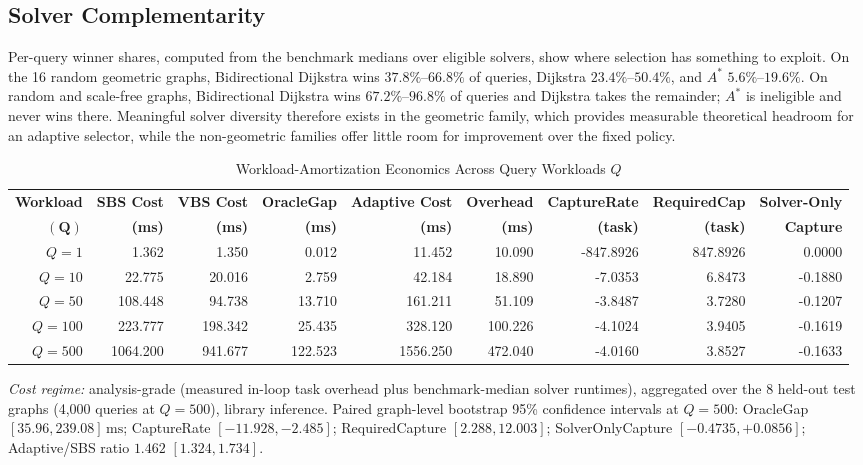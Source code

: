 \documentclass[conference]{IEEEtran}
\begin{document}
\subsection{Solver Complementarity}
\label{sec:complementarity}
Per-query winner shares, computed from the benchmark medians over eligible solvers, show where selection has something to exploit. On the 16 random geometric graphs, Bidirectional Dijkstra wins $37.8\%$--$66.8\%$ of queries, Dijkstra $23.4\%$--$50.4\%$, and $A^*$ $5.6\%$--$19.6\%$. On random and scale-free graphs, Bidirectional Dijkstra wins $67.2\%$--$96.8\%$ of queries and Dijkstra takes the remainder; $A^*$ is ineligible and never wins there. Meaningful solver diversity therefore exists in the geometric family, which provides measurable theoretical headroom for an adaptive selector, while the non-geometric families offer little room for improvement over the fixed policy.

\begin{table}[t]
\caption{Workload-Amortization Economics Across Query Workloads $Q$}
\label{tab:workload_q}
\centering
\begin{tabular}{rrrrrrrrr}
\toprule
\textbf{Workload} & \textbf{SBS Cost} & \textbf{VBS Cost} & \textbf{OracleGap} & \textbf{Adaptive Cost} & \textbf{Overhead} & \textbf{CaptureRate} & \textbf{RequiredCap} & \textbf{Solver-Only} \\
$\mathbf{(Q)}$ & \textbf{(ms)} & \textbf{(ms)} & \textbf{(ms)} & \textbf{(ms)} & \textbf{(ms)} & \textbf{(task)} & \textbf{(task)} & \textbf{Capture} \\
\midrule
$Q = 1$   & 1.362    & 1.350   & 0.012   & 11.452   & 10.090  & -847.8926 & 847.8926 & 0.0000 \\
$Q = 10$  & 22.775   & 20.016  & 2.759   & 42.184   & 18.890  & -7.0353   & 6.8473   & -0.1880 \\
$Q = 50$  & 108.448  & 94.738  & 13.710  & 161.211  & 51.109  & -3.8487   & 3.7280   & -0.1207 \\
$Q = 100$ & 223.777  & 198.342 & 25.435  & 328.120  & 100.226 & -4.1024   & 3.9405   & -0.1619 \\
$Q = 500$ & 1064.200 & 941.677 & 122.523 & 1556.250 & 472.040 & -4.0160   & 3.8527   & -0.1633 \\
\bottomrule
\end{tabular}
\vspace{0.4ex}
\raggedright
\scriptsize \textit{Cost regime:} analysis-grade (measured in-loop task overhead plus benchmark-median solver runtimes), aggregated over the 8 held-out test graphs (4,000 queries at $Q=500$), library inference. Paired graph-level bootstrap 95\% confidence intervals at $Q=500$: OracleGap $[35.96, 239.08]\,\mathrm{ms}$; CaptureRate $[-11.928, -2.485]$; RequiredCapture $[2.288, 12.003]$; SolverOnlyCapture $[-0.4735, +0.0856]$; Adaptive/SBS ratio $1.462$ $[1.324, 1.734]$.
\end{table}
\end{document}
